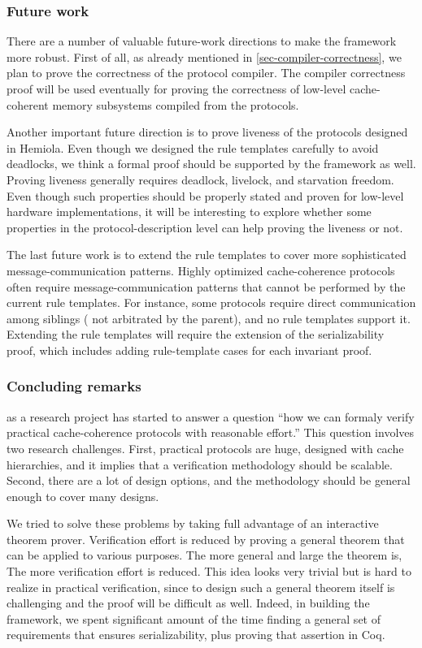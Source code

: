 \subsubsection{Future work}

There are a number of valuable future-work directions to make the \hemiola{} framework more robust.
First of all, as already mentioned in \autoref{sec-compiler-correctness}, we plan to prove the correctness of the protocol compiler.
The compiler correctness proof will be used eventually for proving the correctness of low-level cache-coherent memory subsystems compiled from the \hemiola{} protocols.

Another important future direction is to prove liveness of the protocols designed in Hemiola.
Even though we designed the rule templates carefully to avoid deadlocks, we think a formal proof should be supported by the framework as well.
Proving liveness generally requires deadlock, livelock, and starvation freedom.
Even though such properties should be properly stated and proven for low-level hardware implementations, it will be interesting to explore whether some properties in the protocol-description level can help proving the liveness or not.

The last future work is to extend the rule templates to cover more sophisticated message-communication patterns.
Highly optimized cache-coherence protocols often require message-communication patterns that cannot be performed by the current rule templates.
For instance, some protocols require direct communication among siblings (\ie{} not arbitrated by the parent), and no rule templates support it.
Extending the rule templates will require the extension of the serializability proof, which includes adding rule-template cases for each invariant proof.

\subsubsection{Concluding remarks}

\hemiola{} as a research project has started to answer a question ``how we can formaly verify practical cache-coherence protocols with reasonable effort.''
This question involves two research challenges.
First, practical protocols are huge, designed with cache hierarchies, and it implies that a verification methodology should be scalable.
Second, there are a lot of design options, and the methodology should be general enough to cover many designs.

We tried to solve these problems by taking full advantage of an interactive theorem prover.
Verification effort is reduced by proving a general theorem that can be applied to various purposes.
The more general and large the theorem is, The more verification effort is reduced.
This idea looks very trivial but is hard to realize in practical verification, since to design such a general theorem itself is challenging and the proof will be difficult as well.
Indeed, in building the \hemiola{} framework, we spent significant amount of the time finding a general set of requirements that ensures serializability, plus proving that assertion in Coq.

